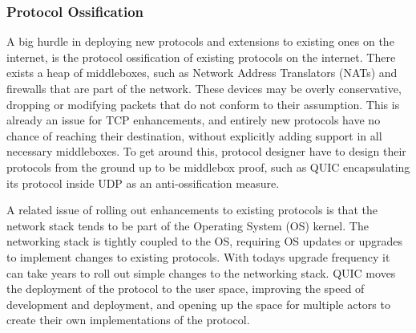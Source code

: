 \documentclass[english, 12pt, a4paper, elec, utf8, a-2b, online]{aaltothesis}
\begin{document}
\subsubsection{Protocol Ossification}
A big hurdle in deploying new protocols and extensions to existing ones on the internet,
is the protocol ossification of existing protocols on the internet. There exists a heap
of middleboxes, such as Network Address Translators (NATs) and firewalls that are
part of the network. These devices may be overly conservative, dropping or 
modifying packets that do not conform to their assumption. This is already an
issue for TCP enhancements, and entirely new protocols have no chance of reaching
their destination, without explicitly adding support in all necessary middleboxes.
To get around this, protocol designer have to design their protocols from the ground
up to be middlebox proof, such as QUIC encapsulating its protocol inside UDP as an
anti-ossification measure\cite{Ossification}.

A related issue of rolling out enhancements to existing protocols is that the
network stack tends to be part of the Operating System (OS) kernel. The networking
stack is tightly coupled to the OS, requiring OS updates or upgrades to implement
changes to existing protocols. With todays upgrade frequency it can take years
to roll out simple changes to the networking stack. QUIC moves the deployment of the 
protocol to the user space, improving the speed of development and deployment,
and opening up the space for multiple actors to create their own implementations of
the protocol\cite{quic_transport_protocol_design}.
\end{document}
